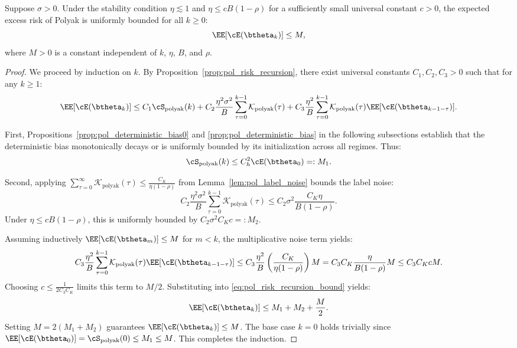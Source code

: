 \documentclass[11pt]{article}
\newcommand{\polyak}{\mathrm{polyak}}
\begin{document}
\begin{lemma}
\label{lem:pol_loss_bounded}
Suppose $\sigma > 0$. Under the stability condition $\eta \lesssim 1$ and $\eta \le c B(1-\rho)$ for a sufficiently small universal constant $c > 0$, the expected excess risk of Polyak is uniformly bounded for all $k \ge 0$:
\[
    \EE[\cE(\btheta_k)] \le M,
\]
where $M > 0$ is a constant independent of $k$, $\eta$, $B$, and $\rho$.
\end{lemma}

\begin{proof}
We proceed by induction on $k$. By Proposition~\ref{prop:pol_risk_recursion}, there exist universal constants $C_1, C_2, C_3 > 0$ such that for any $k \ge 1$:
\begin{equation} \label{eq:pol_risk_recursion_bound}
    \EE[\cE(\btheta_k)] \le C_1 \cS_{\polyak}(k) + C_2 \frac{\eta^2\sigma^2}{B}\sum_{\tau=0}^{k-1}\mathcal{K}_{\polyak}(\tau) + C_3 \frac{\eta^2}{B}\sum_{\tau=0}^{k-1}\mathcal{K}_{\polyak}(\tau)\EE[\cE(\btheta_{k-1-\tau})].
\end{equation}

First, Propositions~\ref{prop:pol_deterministic_bias0} and \ref{prop:pol_deterministic_bias} in the following subsections establish that the deterministic bias monotonically decays or is uniformly bounded by its initialization across all regimes. Thus:
\[
    \cS_{\polyak}(k) \le C_h^2 \cE(\btheta_0) =: M_1.
\]

Second, applying $\sum_{\tau=0}^\infty \mathcal{K}_{\polyak}(\tau) \le \frac{C_K}{\eta(1-\rho)}$ from Lemma~\ref{lem:pol_label_noise} bounds the label noise:
\[
    C_2 \frac{\eta^2\sigma^2}{B}\sum_{\tau=0}^{k-1}\mathcal{K}_{\polyak}(\tau) \le C_2 \sigma^2 \frac{C_K \eta}{B(1-\rho)}.
\]
Under $\eta \le c B(1-\rho)$, this is uniformly bounded by $C_2 \sigma^2 C_K c =: M_2$.

Assuming inductively $\EE[\cE(\btheta_m)] \le M$ for $m < k$, the multiplicative noise term yields:
\[
    C_3 \frac{\eta^2}{B}\sum_{\tau=0}^{k-1}\mathcal{K}_{\polyak}(\tau)\EE[\cE(\btheta_{k-1-\tau})] \le C_3 \frac{\eta^2}{B} \left( \frac{C_K}{\eta(1-\rho)} \right) M = C_3 C_K \frac{\eta}{B(1-\rho)} M \le C_3 C_K c M.
\]
Choosing $c \le \frac{1}{2 C_3 C_K}$ limits this term to $M/2$. Substituting into \eqref{eq:pol_risk_recursion_bound} yields:
\[
    \EE[\cE(\btheta_k)] \le M_1 + M_2 + \frac{M}{2}.
\]
Setting $M = 2(M_1 + M_2)$ guarantees $\EE[\cE(\btheta_k)] \le M$. The base case $k=0$ holds trivially since $\EE[\cE(\btheta_0)] = \cS_{\polyak}(0) \le M_1 \le M$. This completes the induction.
\end{proof}
\end{document}
